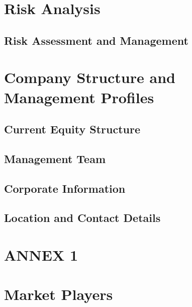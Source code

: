 \documentclass[11pt]{article}
\begin{document}
\section{Risk Analysis}
  \subsection{Risk Assessment and Management}
\section{Company Structure and Management Profiles}
  \subsection{Current Equity Structure}
  \subsection{Management Team}
  \subsection{Corporate Information}
  \subsection{Location and Contact Details}
\section{ANNEX 1}
\section{Market Players}
\end{document}
